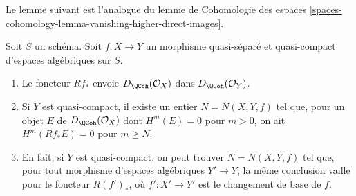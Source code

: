 \noindent
Le lemme suivant est l'analogue du
lemme de Cohomologie des espaces
\ref{spaces-cohomology-lemma-vanishing-higher-direct-images}.

\begin{lemma}
\label{lemma-quasi-coherence-direct-image}
Soit $S$ un schéma. Soit $f : X \to Y$ un morphisme quasi-séparé et quasi-compact
d'espaces algébriques sur $S$.
\begin{enumerate}
\item Le foncteur $Rf_*$ envoie $D_\QCoh(\mathcal{O}_X)$
dans $D_\QCoh(\mathcal{O}_Y)$.
\item Si $Y$ est quasi-compact, il existe un entier $N = N(X, Y, f)$
tel que, pour un objet $E$ de $D_\QCoh(\mathcal{O}_X)$
dont $H^m(E) = 0$ pour $m > 0$, on ait
$H^m(Rf_*E) = 0$ pour $m \geq N$.
\item En fait, si $Y$ est quasi-compact, on peut trouver $N = N(X, Y, f)$
tel que, pour tout morphisme d'espaces algébriques $Y' \to Y$,
la même conclusion vaille pour le foncteur $R(f')_*$,
où $f' : X' \to Y'$ est le changement de base de $f$.
\end{enumerate}
\end{lemma}

